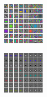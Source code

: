 \begin{figure}[ht]
\begin{subfigure}[b]{\figsize}
\includegraphics[width=\textwidth]{./figures/slow/filters_not_slow.png} \caption{}
\label{fig:L1filters} \end{subfigure} \hspace{\figspace}
\begin{subfigure}[b]{\figsize}
\includegraphics[width=\textwidth]{./figures/slow/Rebbutal_Figures/filters_group_sparse.png}

\end{subfigure}
\end{figure}
